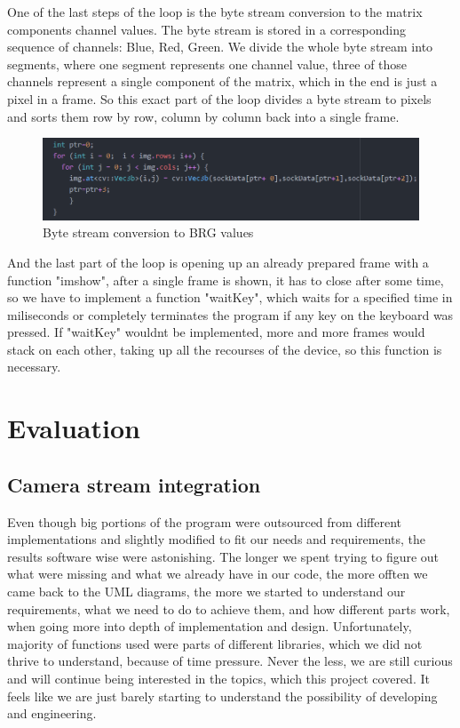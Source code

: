 \documentclass[conference]{IEEEtran}
\begin{document}
\newline
One of the last steps of the loop is the byte stream conversion to the matrix components channel values. The byte stream is stored in a corresponding sequence of channels: Blue, Red, Green. We divide the whole byte stream into segments, where one segment represents one channel value, three of those channels represent a single component of the matrix, which in the end is just a pixel in a frame. So this exact part of the loop divides a byte stream to pixels and sorts them row by row, column by column back into a single frame.
\begin{figure}[h!]
	\includegraphics[width=\linewidth]{ServerCodeExample3.png}
	\caption{Byte stream conversion to BRG values}
	\label{fig:SCE3}
\end{figure}
\newline
And the last part of the loop is opening up an already prepared frame with a function "imshow", after a single frame is shown, it has to close after some time, so we have to implement a function "waitKey", which waits for a specified time in miliseconds or completely terminates the program if any key on the keyboard was pressed. If "waitKey" wouldnt be implemented, more and more frames would stack on each other, taking up all the recourses of the device, so this function is necessary.

\section{Evaluation}
\subsection{Camera stream integration}
Even though big portions of the program were outsourced from different implementations and slightly modified to fit our needs and requirements, the results software wise were astonishing. The longer we spent trying to figure out what were missing and what we already have in our code, the more offten we came back to the UML diagrams, the more we started to understand our requirements, what we need to do to achieve them, and how different parts work, when going more into depth of implementation and design. Unfortunately, majority of functions used were parts of different libraries, which we did not thrive to understand, because of time pressure. Never the less, we are still curious and will continue being interested in the topics, which this project covered. It feels like we are just barely starting to understand the possibility of developing and engineering.
\end{document}
